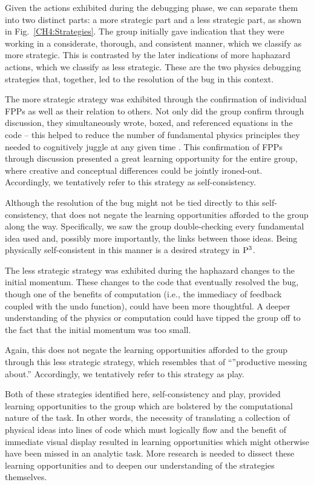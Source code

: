 \documentclass{msuphddissertation}
\begin{document}
\begin{doublespace}
Given the actions exhibited during the debugging phase, we can separate them into two distinct parts: a more strategic part and a less strategic part, as shown in Fig.~\ref{CH4:Strategies}. The group initially gave indication that they were working in a considerate, thorough, and consistent manner, which we classify as more strategic. This is contrasted by the later indications of more haphazard actions, which we classify as less strategic. These are the two physics debugging strategies that, together, led to the resolution of the bug in this context.

The more strategic strategy was exhibited through the confirmation of individual FPPs as well as their relation to others. Not only did the group confirm through discussion, they simultaneously wrote, boxed, and referenced equations in the code -- this helped to reduce the number of fundamental physics principles they needed to cognitively juggle at any given time \cite{AAPT2016}. This confirmation of FPPs through discussion presented a great learning opportunity for the entire group, where creative and conceptual differences could be jointly ironed-out. Accordingly, we tentatively refer to this strategy as self-consistency.

Although the resolution of the bug might not be tied directly to this self-consistency, that does not negate the learning opportunities afforded to the group along the way. Specifically, we saw the group double-checking every fundamental idea used and, possibly more importantly, the links between those ideas. Being physically self-consistent in this manner is a desired strategy in ${\rm P}^{3}$.

The less strategic strategy was exhibited during the haphazard changes to the initial momentum. These changes to the code that eventually resolved the bug, though one of the benefits of computation (i.e., the immediacy of feedback coupled with the undo function), could have been more thoughtful. A deeper understanding of the physics or computation could have tipped the group off to the fact that the initial momentum was too small.

Again, this does not negate the learning opportunities afforded to the group through this less strategic strategy, which resembles  that of ``''productive messing about.'' \cite{AAPT2016}  Accordingly, we tentatively refer to this strategy as play.

Both of these strategies identified here, self-consistency and play, provided learning opportunities to the group which are bolstered by the computational nature of the task. In other words, the necessity of translating a collection of physical ideas into lines of code which must logically  flow and the benefit of immediate visual display resulted in learning opportunities which might otherwise have been missed in an analytic task. More research is needed to dissect these learning opportunities and to deepen our understanding of the strategies themselves.


\end{doublespace}
\end{document}
